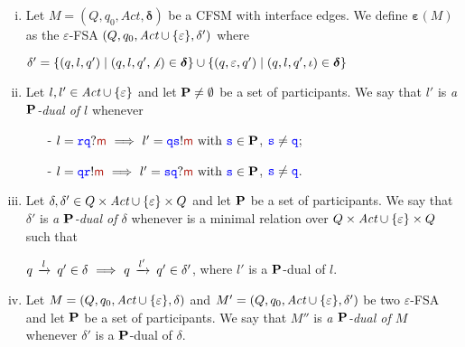 \begin{definition}\label{def:PD}%
\begin{enumerate}[i)]
\item
Let $M=(Q,q_0,\textit{Act},\bm{\delta})$ be a CFSM with interface edges. We define
$\bm{\varepsilon}(M)$ as  the $\varepsilon$-FSA $(Q,q_0,\textit{Act}\cup\{\varepsilon\},\delta')$   where\\
\centerline{
$\delta' = \{(q,l,q') \mid (q,l,q',\not\iota) \in \bm{\delta}\}\cup \{(q,\varepsilon,q') \mid (q,l,q',\iota) \in \bm{\delta}\}$  }
\item
Let $l,l'\in\textit{Act}\cup\{\varepsilon\}$ and  let $\mathbf{P}\neq\emptyset$ be a set of participants.
We say that $l'$ is {\em a $\mathbf{P}$-dual of $l$} whenever 
\begin{itemize}
\item[-]
$l = \ttr\ttq?\msg[m] \implies l'= \ttq\tts!\msg[m] \text{ with } \tts\in\roles$, ${\mathtt{\color{blue}{ {s}}}}\neq{ \ensuremath{\mathtt{\color{blue}{ {q}}}} }$;
\item[-]
$l = \ttq\ttr!\msg[m] \implies l'= \tts\ttq?\msg[m] \text{ with } \tts\in\roles$, ${\mathtt{\color{blue}{ {s}}}}\neq{ \ensuremath{\mathtt{\color{blue}{ {q}}}} }$.
\end{itemize}
\item
Let $\delta,\delta'\in Q\times\textit{Act}\cup\{\varepsilon\}\times Q$ and  let $\mathbf{P}$ be a set of participants.
We say that $\delta'$ is {\em a $\mathbf{P}$-dual of $\delta$} whenever is a minimal relation over
 $Q\times\textit{Act}\cup\{\varepsilon\}\times Q$ such that\\
\centerline{
$q\,\xrightarrow{l}_{{}}\,q'\in\delta ~\Longrightarrow~ q\,\xrightarrow{l'}_{{}}\,q'\in\delta'$, where $l'$ is a $\mathbf{P}$-dual of $l$.
}
\item
Let $M=(Q,q_0,\textit{Act}\cup\{\varepsilon\},\delta)$ and $M'=(Q,q_0,\textit{Act}\cup\{\varepsilon\},\delta')$ be two $\varepsilon$-FSA and  let $\mathbf{P}$ be a set of participants.
We say that $M''$ is {\em a $\mathbf{P}$-dual of $M$} whenever $\delta'$ is a $\mathbf{P}$-dual of $\delta$.
\end{enumerate}
\end{definition}

